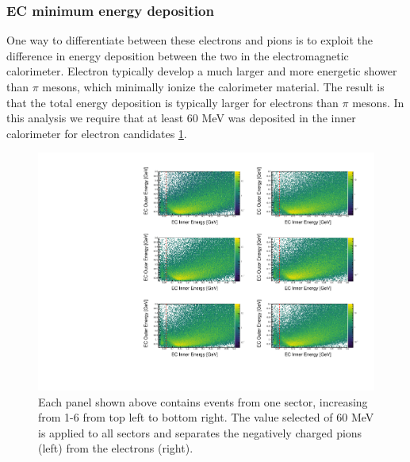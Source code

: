 
\subsubsection*{EC minimum energy deposition}
One way to differentiate between these electrons and pions is to exploit the difference in energy deposition between the two in the electromagnetic calorimeter.  Electron typically develop a much larger and more energetic shower than $\pi$ mesons, which minimally ionize the calorimeter material.  The result is that the total energy deposition is typically larger for electrons than $\pi$ mesons.  In this analysis we require that at least 60 MeV was deposited in the inner calorimeter for electron candidates \ref{fig:ec-edep}.  

\begin{figure}
	\centering
	\label{fig:ec-edep}
	\includegraphics[width=\textwidth]{image/plots/electron-id/summary-ec-edep.pdf}
	\caption{Each panel shown above contains events from one sector, increasing from 1-6 from top left to bottom right.  The value selected of 60 MeV is applied to all sectors and separates the negatively charged pions (left) from the electrons (right).}
\end{figure}

